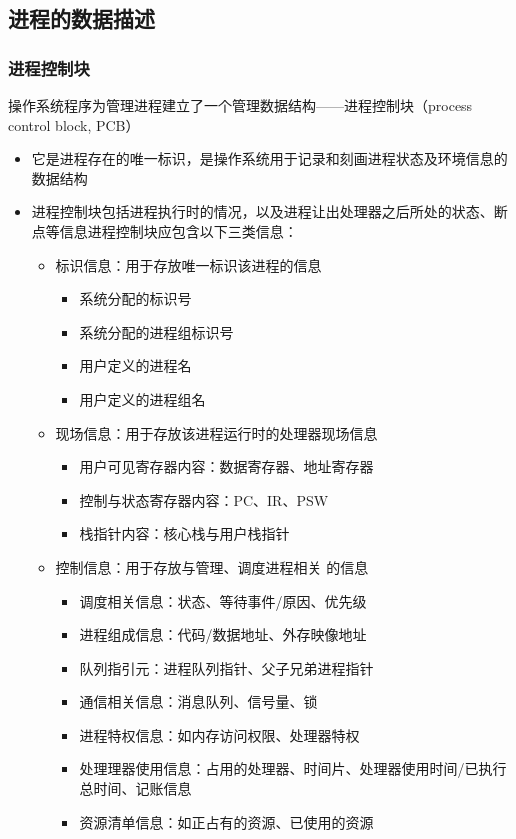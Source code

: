 \documentclass[cs4size,a4paper,10pt]{ctexart}
\begin{document}
	\subsection{进程的数据描述}
	\subsubsection{进程控制块}
	操作系统程序为管理进程建立了一个管理数据结构——进程控制块（process control block, PCB）
	\begin{itemize}
		\item 它是进程存在的唯一标识，是操作系统用于记录和刻画进程状态及环境信息的数据结构
		\item 进程控制块包括进程执行时的情况，以及进程让出处理器之后所处的状态、断点等信息进程控制块应包含以下三类信息：
		\begin{itemize}
			\item 标识信息：用于存放唯一标识该进程的信息
			\begin{itemize}
				\item 系统分配的标识号
				\item 系统分配的进程组标识号
				\item 用户定义的进程名
				\item 用户定义的进程组名
			\end{itemize}
			\item 现场信息：用于存放该进程运行时的处理器现场信息
			\begin{itemize}
				\item 用户可见寄存器内容：数据寄存器、地址寄存器
				\item 控制与状态寄存器内容：PC、IR、PSW
				\item 栈指针内容：核心栈与用户栈指针
			\end{itemize}
			\item 控制信息：用于存放与管理、调度进程相关
			的信息
			\begin{itemize}
				\item 调度相关信息：状态、等待事件/原因、优先级
				\item 进程组成信息：代码/数据地址、外存映像地址
				\item 队列指引元：进程队列指针、父子兄弟进程指针
				\item 通信相关信息：消息队列、信号量、锁
				\item 进程特权信息：如内存访问权限、处理器特权
				\item 处理理器使用信息：占用的处理器、时间片、处理器使用时间/已执行总时间、记账信息
				\item 资源清单信息：如正占有的资源、已使用的资源
			\end{itemize}
		\end{itemize}
	\end{itemize}
\end{document}

